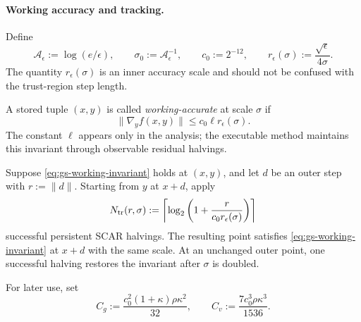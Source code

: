 \paragraph{Working accuracy and tracking.}

Define
\begin{equation}
    \mathcal A_\epsilon
    :=
    \log(e/\epsilon),
    \qquad
    \sigma_0
    :=
    \mathcal A_\epsilon^{-1},
    \qquad
    c_0:=2^{-12},
    \qquad
    r_\epsilon(\sigma)
    :=
    \frac{\sqrt\epsilon}{4\sigma}.
    \label{eq:gs-parameters}
\end{equation}
The quantity $r_\epsilon(\sigma)$ is an inner accuracy scale and
should not be confused with the trust-region step length.

A stored tuple $(x,y)$ is called \emph{working-accurate} at scale
$\sigma$ if
\begin{equation}
    \|\nabla_yf(x,y)\|
    \le
    c_0\ell r_\epsilon(\sigma).
    \label{eq:gs-working-invariant}
\end{equation}
The constant $\ell$ appears only in the analysis; the executable
method maintains this invariant through observable residual halvings.

\begin{lemma}
\label{lem:gs-tracking}
Suppose \eqref{eq:gs-working-invariant} holds at $(x,y)$, and let
$d$ be an outer step with $r:=\|d\|$.
Starting from $y$ at $x+d$, apply
\begin{equation}
    N_{\rm tr}(r,\sigma)
    :=
    \left\lceil
        \log_2\left(
            1+
            \frac{r}{
                c_0r_\epsilon(\sigma)
            }
        \right)
    \right\rceil
    \label{eq:gs-tracking-count}
\end{equation}
successful persistent SCAR halvings.
The resulting point satisfies
\eqref{eq:gs-working-invariant} at $x+d$ with the same scale.
At an unchanged outer point, one successful halving restores the
invariant after $\sigma$ is doubled.
\end{lemma}

For later use, set
\begin{equation}
    C_g
    :=
    \frac{
        c_0^2(1+\kappa)\rho\kappa^2
    }{32},
    \qquad
    C_v
    :=
    \frac{
        7c_0^3\rho\kappa^3
    }{1536}.
    \label{eq:gs-error-constants}
\end{equation}

